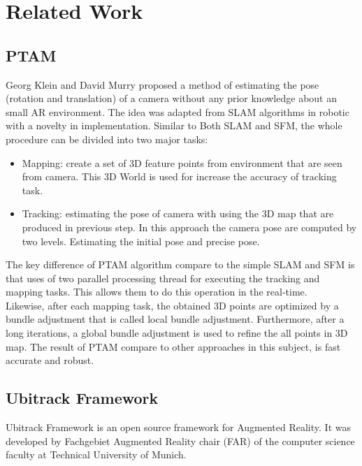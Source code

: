 \section{Related Work}
\subsection{PTAM}
Georg Klein and David Murry \cite{klein2007parallel} proposed a method of estimating the pose (rotation and translation) of a camera without any prior knowledge about an small AR environment. The idea was adapted from SLAM algorithms in robotic with a novelty in implementation. Similar to Both SLAM and SFM, the whole procedure can be divided into two major tasks:
\begin{itemize}
\item Mapping: create a set of 3D feature points from environment that are seen from camera. This 3D World is used for increase the accuracy of tracking task.
\item Tracking: estimating the pose of camera with using the 3D map that are produced in previous step. In this approach the camera pose are computed by two levels. Estimating the initial pose and precise pose.
\end{itemize}
The key difference of PTAM algorithm compare to the simple SLAM and SFM is that uses of two parallel processing thread for executing the tracking and mapping tasks. This allows them to do this operation in the real-time.\\
Likewise, after each mapping task, the obtained 3D points are optimized by a bundle adjustment that is called local bundle adjustment. Furthermore, after a long iterations, a global bundle adjustment is used to refine the all points in 3D map. The result of PTAM compare to other approaches in this subject, is fast accurate and robust.

\subsection{Ubitrack Framework}
Ubitrack Framework is an open source framework for Augmented Reality. It was developed by Fachgebiet Augmented Reality chair (FAR) of the computer science faculty at Technical University of Munich.



